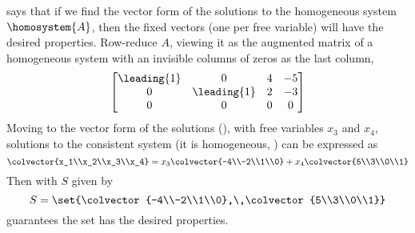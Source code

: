  says that if we find the vector form of the solutions to the homogeneous system $\homosystem{A}$, then the fixed vectors (one per free variable) will have the desired properties.  Row-reduce $A$, viewing it as the augmented matrix of a homogeneous system with an invisible columns of zeros as the last column,
%
\begin{equation*}
\begin{bmatrix}
\leading{1} & 0 & 4 & -5\\
0 & \leading{1} & 2 & -3\\ 
0 & 0 & 0 & 0
\end{bmatrix}
\end{equation*}
%
Moving to the vector form of the solutions (), with free variables $x_3$ and $x_4$, solutions to the consistent system (it is homogeneous, ) can be expressed as
%
\begin{equation*}
\colvector{x_1\\x_2\\x_3\\x_4}
=
x_3\colvector{-4\\-2\\1\\0}+
x_4\colvector{5\\3\\0\\1}
\end{equation*}
%
Then with $S$ given by 
%
\begin{equation*}
S=\set{\colvector{-4\\-2\\1\\0},\,\colvector{5\\3\\0\\1}}
\end{equation*}
%
 guarantees the set has the desired properties.
